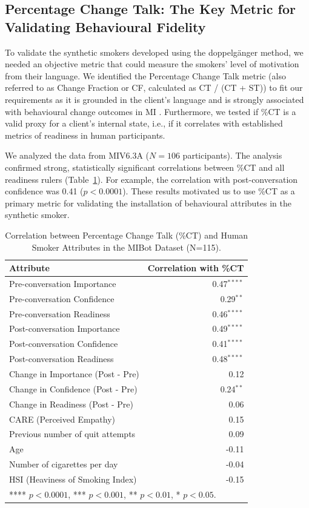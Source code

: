 \subsection{Percentage Change Talk: The Key Metric for Validating Behavioural Fidelity}

To validate the synthetic smokers developed using the doppelgänger method, we needed an objective metric that could measure the smokers' level of motivation from their language.
We identified the Percentage Change Talk metric (also referred to as Change Fraction or CF, calculated as CT / (CT + ST)) to fit our requirements as it is grounded in the client's language and is strongly associated with behavioural change outcomes in MI \cite{Barnett2014,Houck2018,Moyers2009,Baer2008}.
Furthermore, we tested if \%CT is a valid proxy for a client's internal state, i.e., if it correlates with established metrics of readiness in human participants.

We analyzed the data from MIV6.3A ($N=106$ participants). The analysis confirmed strong, statistically significant correlations between \%CT and all readiness rulers (Table~\ref{tab:ct-correlation}). For example, the correlation with post-conversation confidence was 0.41 ($p < 0.0001$). These results motivated us to use \%CT as a primary metric for validating the installation of behavioural attributes in the synthetic smoker.


\begin{table}[!ht]
\centering
\begin{tabular}{@{}lr@{}}
\toprule
\textbf{Attribute} & \textbf{Correlation with \%CT} \\
\midrule
Pre-conversation Importance & 0.47$^{****}$ \\
Pre-conversation Confidence & 0.29$^{**}$ \\
Pre-conversation Readiness & 0.46$^{****}$ \\
\midrule
Post-conversation Importance & 0.49$^{****}$ \\
Post-conversation Confidence & 0.41$^{****}$ \\
Post-conversation Readiness & 0.48$^{****}$ \\
\midrule
Change in Importance (Post - Pre) & 0.12 \\
Change in Confidence (Post - Pre) & 0.24$^{**}$ \\
Change in Readiness (Post - Pre) & 0.06 \\
\midrule
CARE (Perceived Empathy) & 0.15 \\
Previous number of quit attempts & 0.09 \\
Age & -0.11 \\
Number of cigarettes per day & -0.04 \\
HSI (Heaviness of Smoking Index) & -0.15 \\
\bottomrule
\multicolumn{2}{l}{\footnotesize{**** $p < 0.0001$, *** $p < 0.001$, ** $p < 0.01$, * $p < 0.05$}.}
\end{tabular}
\caption{Correlation between Percentage Change Talk (\%CT) and Human Smoker Attributes in the MIBot Dataset (N=115).}
\label{tab:ct-correlation}
\end{table}



